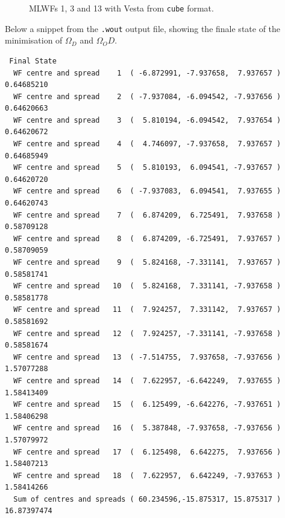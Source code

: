 \begin{itemize}
\begin{figure}[h!]
\centering
{}
\centering
{}
\centering
{}
\caption{MLWFs 1, 3 and 13 with Vesta from {\tt cube} format.}\label{fig12.3}
\end{figure}


Below a snippet from the {\tt .wout} output file, showing the finale state of the minimisation of $\Omega_D$ and $\Omega_OD$.
  \begin{tcolorbox}[floatplacement=h!,float,nobeforeafter,sharp corners,boxrule=0.5pt]
  {\small
\begin{verbatim}
 Final State
  WF centre and spread    1  ( -6.872991, -7.937658,  7.937657 )     0.64685210
  WF centre and spread    2  ( -7.937084, -6.094542, -7.937656 )     0.64620663
  WF centre and spread    3  (  5.810194, -6.094542,  7.937654 )     0.64620672
  WF centre and spread    4  (  4.746097, -7.937658,  7.937657 )     0.64685949
  WF centre and spread    5  (  5.810193,  6.094541, -7.937657 )     0.64620720
  WF centre and spread    6  ( -7.937083,  6.094541,  7.937655 )     0.64620743
  WF centre and spread    7  (  6.874209,  6.725491,  7.937658 )     0.58709128
  WF centre and spread    8  (  6.874209, -6.725491,  7.937657 )     0.58709059
  WF centre and spread    9  (  5.824168, -7.331141,  7.937657 )     0.58581741
  WF centre and spread   10  (  5.824168,  7.331141, -7.937658 )     0.58581778
  WF centre and spread   11  (  7.924257,  7.331142,  7.937657 )     0.58581692
  WF centre and spread   12  (  7.924257, -7.331141, -7.937658 )     0.58581674
  WF centre and spread   13  ( -7.514755,  7.937658, -7.937656 )     1.57077288
  WF centre and spread   14  (  7.622957, -6.642249,  7.937655 )     1.58413409
  WF centre and spread   15  (  6.125499, -6.642276, -7.937651 )     1.58406298
  WF centre and spread   16  (  5.387848, -7.937658, -7.937656 )     1.57079972
  WF centre and spread   17  (  6.125498,  6.642275,  7.937656 )     1.58407213
  WF centre and spread   18  (  7.622957,  6.642249, -7.937653 )     1.58414266
  Sum of centres and spreads ( 60.234596,-15.875317, 15.875317 )    16.87397474


\end{verbatim}}
\end{tcolorbox}
\end{itemize}
